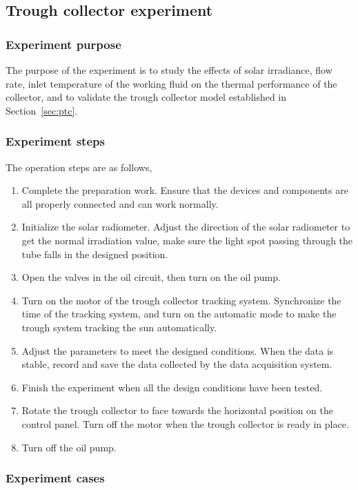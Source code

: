 \subsection{Trough collector experiment}
\subsubsection{Experiment purpose}
The purpose of the experiment is to study the effects of solar irradiance, flow rate, inlet temperature of the working fluid on the thermal performance of the collector, and to validate the trough collector model established in Section~\ref{sec:ptc}. 
\subsubsection{Experiment steps}
The operation steps are as follows,
\begin{enumerate}[label=(\arabic*)]
	\item Complete the preparation work. Ensure that the devices and components are all properly connected and can work normally.
	\item Initialize the solar radiometer. Adjust the direction of the solar radiometer to get the normal irradiation value, make sure the light spot passing through the tube falls in the designed position.
	\item Open the valves in the oil circuit, then turn on the oil pump.
	\item Turn on the motor of the trough collector tracking system. Synchronize the time of the tracking system, and turn on the automatic mode to make the trough system tracking the sun automatically.
	\item Adjust the parameters to meet the designed conditions. When the data is stable, record and save the data collected by the data acquisition system.
	\item Finish the experiment when all the design conditions have been tested.
	\item Rotate the trough collector to face towards the horizontal position on the control panel. Turn off the motor when the trough collector is ready in place.
	\item Turn off the oil pump.
\end{enumerate}

\subsubsection{Experiment cases}


